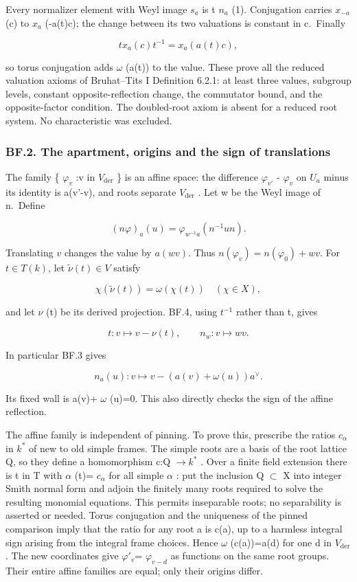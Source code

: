\documentclass[
  11pt,
]{article}
\begin{document}
Every normalizer element with Weyl image \(s_{a}\) is t \(n_{a}\) (1).
Conjugation carries \(x_{-a}\) (c) to \(x_{a}\) (-a(t)c); the change
between its two valuations is constant in c.~Finally

\[
 t x_a(c)t^{-1}=x_a(a(t)c),
\]

so torus conjugation adds \(\omega\) (a(t)) to the value. These prove
all the reduced valuation axioms of Bruhat--Tits I Definition 6.2.1: at
least three values, subgroup levels, constant opposite-reflection
change, the commutator bound, and the opposite-factor condition. The
doubled-root axiom is absent for a reduced root system. No
characteristic was excluded.

\subsubsection{BF.2. The apartment, origins and the sign of
translations}\label{bf.2.-the-apartment-origins-and-the-sign-of-translations}

The family \{ \(\varphi_{v}\) :v in \(V_{\mathrm{der}}\) \} is an affine
space: the difference \(\varphi_{v'}\) - \(\varphi_{v}\) on \(U_{a}\)
minus its identity is a(v'-v), and roots separate \(V_{\mathrm{der}}\) .
Let w be the Weyl image of n.~Define

\[
 (n\varphi)_a(u)=\varphi_{w^{-1}a}(n^{-1}un).
 \tag{BF.4}
\]

Translating \(v\) changes the value by \(a(wv)\). Thus
\(n(\varphi_v)=n(\varphi_0)+wv\). For \(t\in T(k)\), let
\(\widetilde\nu(t)\in V\) satisfy

\[
 \chi(\widetilde\nu(t))=\omega(\chi(t))\quad(\chi\in X),
\]

and let \(\nu\) (t) be its derived projection. BF.4, using \(t^{-1}\)
rather than t, gives

\[
 t:v\mapsto v-\nu(t),\qquad n_w:v\mapsto wv.
 \tag{BF.5}
\]

In particular BF.3 gives

\[
 n_a(u):v\mapsto v-(a(v)+\omega(u))a^\vee.
 \tag{BF.6}
\]

Its fixed wall is a(v)+ \(\omega\) (u)=0. This also directly checks the
sign of the affine reflection.

The affine family is independent of pinning. To prove this, prescribe
the ratios \(c_{\alpha}\) in \(k^*\) of new to old simple frames. The
simple roots are a basis of the root lattice Q, so they define a
homomorphism c:Q \(\to k^*\) . Over a finite field extension there is t
in T with \(\alpha\) (t)= \(c_{\alpha}\) for all simple \(\alpha\) : put
the inclusion Q \(\subset\) X into integer Smith normal form and adjoin
the finitely many roots required to solve the resulting monomial
equations. This permits inseparable roots; no separability is asserted
or needed. Torus conjugation and the uniqueness of the pinned comparison
imply that the ratio for any root a is c(a), up to a harmless integral
sign arising from the integral frame choices. Hence \(\omega\)
(c(a))=a(d) for one d in \(V_{\mathrm{der}}\) . The new coordinates give
\(\varphi'_v\)= \(\varphi_{v-d}\) as functions on the same root groups.
Their entire affine families are equal; only their origins differ.
\end{document}
